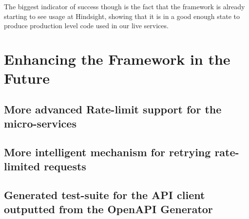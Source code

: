 The biggest indicator of success though is the fact that the framework is already starting to see usage at Hindsight, showing that it is in a good enough state to produce production level code used in our live services.

\section{Enhancing the Framework in the Future}
\subsection{More advanced Rate-limit support for the micro-services}
\subsection{More intelligent mechanism for retrying rate-limited requests}
\subsection{Generated test-suite for the API client outputted from the OpenAPI Generator}